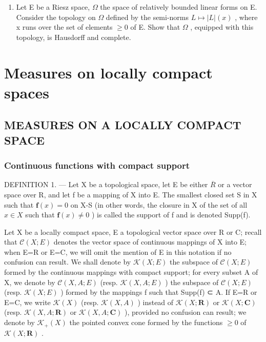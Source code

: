\begin{enumerate}
\def\labelenumi{\arabic{enumi})}
\setcounter{enumi}{8}
\tightlist
\item
  Let E be a Riesz space, \(\Omega\) the space of relatively bounded linear forms on E. Consider the topology on \(\Omega\) defined by the semi-norms \(L \mapsto |L|(x)\) , where x runs over the set of elements \(\geqslant 0\) of E. Show that \(\Omega\) , equipped with this topology, is Hausdorff and complete.
\end{enumerate}

\chapter{Measures on locally compact spaces}

\section{MEASURES ON A LOCALLY COMPACT SPACE}

\subsection{Continuous functions with compact support}

DEFINITION 1. --- Let X be a topological space, let E be either \(\overline{R}\) or a vector space over R, and let f be a mapping of X into E. The smallest closed set S in X such that \(\mathbf{f}(x)=0\) on X-S (in other words, the closure in X of the set of all \(x\in X\) such that \(\mathbf{f}(x)\neq0\) ) is called the support of f and is denoted Supp(f).

Let X be a locally compact space, E a topological vector space over R or C; recall that \(\mathcal{C}(X;E)\) denotes the vector space of continuous mappings of X into E; when E=R or E=C, we will omit the mention of E in this notation if no confusion can result. We shall denote by \(\mathcal{K}(X;E)\) the subspace of \(\mathcal{C}(X;E)\) formed by the continuous mappings with compact support; for every subset A of X, we denote by \(\mathcal{C}(X,A;E)\) (resp. \(\mathcal{K}(X,A;E)\) ) the subspace of \(\mathcal{C}(X;E)\) (resp. \(\mathcal{K}(X;E)\) ) formed by the mappings f such that Supp(f) ⊂ A. If E=R or E=C, we write \(\mathcal{K}(X)\) (resp. \(\mathcal{K}(X,A)\) ) instead of \(\mathcal{K}(X;\mathbf{R})\) or \(\mathcal{K}(X;\mathbf{C})\) (resp. \(\mathcal{K}(X,A;\mathbf{R})\) or \(\mathcal{K}(X,A;\mathbf{C})\) ), provided no confusion can result; we denote by \(\mathcal{K}_{+}(X)\) the pointed convex cone formed by the functions \(\geqslant0\) of \(\mathcal{K}(X;\mathbf{R})\) .

